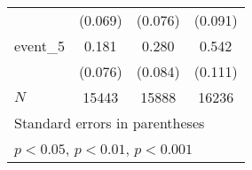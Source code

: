 {\begin{tabular}{l*{3}{c}}
            &     (0.069)         &     (0.076)         &     (0.091)         \\
[1em]
event\_5     &       0.181\sym{*}  &       0.280\sym{***}&       0.542\sym{***}\\
            &     (0.076)         &     (0.084)         &     (0.111)         \\
\hline
\(N\)       &       15443         &       15888         &       16236         \\
\hline\hline
\multicolumn{4}{l}{\footnotesize Standard errors in parentheses}\\
\multicolumn{4}{l}{\footnotesize \sym{*} \(p<0.05\), \sym{**} \(p<0.01\), \sym{***} \(p<0.001\)}\\
\end{tabular}
}
